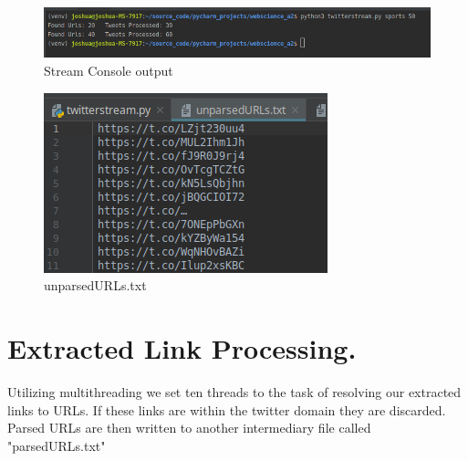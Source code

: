 \documentclass[11pt]{article}
\begin{document}
	\begin{figure}[h!]
		\includegraphics[scale=0.5]{resources/stream_console_out.png}
		\caption{Stream Console output}
	\end{figure}
	\begin{figure}[h!]
		\includegraphics[scale=0.8]{resources/unparsedURLs.png}
		\caption{unparsedURLs.txt}
	\end{figure}
	\section{Extracted Link Processing. }
	\hspace{10mm} Utilizing multithreading we set ten threads to the task of resolving our extracted links to URLs. If these links are within the twitter domain they are discarded. Parsed URLs are then written to another intermediary file called "parsedURLs.txt" 
\end{document}
